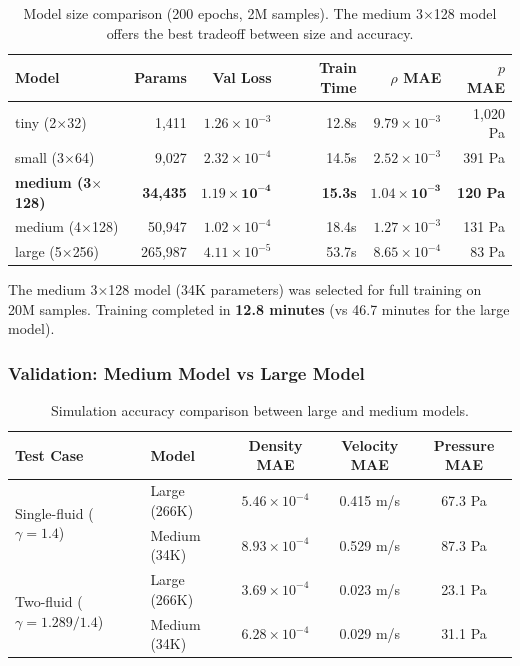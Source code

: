 \documentclass[11pt,a4paper]{article}
\begin{document}
\begin{table}[H]
\centering
\begin{tabular}{lrrrrr}
\toprule
Model & Params & Val Loss & Train Time & $\rho$ MAE & $p$ MAE \\
\midrule
tiny (2$\times$32) & 1,411 & $1.26 \times 10^{-3}$ & 12.8s & $9.79 \times 10^{-3}$ & 1,020 Pa \\
small (3$\times$64) & 9,027 & $2.32 \times 10^{-4}$ & 14.5s & $2.52 \times 10^{-3}$ & 391 Pa \\
\textbf{medium (3$\times$128)} & \textbf{34,435} & $\mathbf{1.19 \times 10^{-4}}$ & \textbf{15.3s} & $\mathbf{1.04 \times 10^{-3}}$ & \textbf{120 Pa} \\
medium (4$\times$128) & 50,947 & $1.02 \times 10^{-4}$ & 18.4s & $1.27 \times 10^{-3}$ & 131 Pa \\
large (5$\times$256) & 265,987 & $4.11 \times 10^{-5}$ & 53.7s & $8.65 \times 10^{-4}$ & 83 Pa \\
\bottomrule
\end{tabular}
\caption{Model size comparison (200 epochs, 2M samples). The medium 3$\times$128 model offers the best tradeoff between size and accuracy.}
\label{tab:model_sizes}
\end{table}

The medium 3$\times$128 model (34K parameters) was selected for full training on 20M samples. Training completed in \textbf{12.8 minutes} (vs 46.7 minutes for the large model).

\subsubsection{Validation: Medium Model vs Large Model}

\begin{table}[H]
\centering
\begin{tabular}{llccc}
\toprule
Test Case & Model & Density MAE & Velocity MAE & Pressure MAE \\
\midrule
\multirow{2}{*}{Single-fluid ($\gamma=1.4$)}
    & Large (266K) & $5.46 \times 10^{-4}$ & 0.415 m/s & 67.3 Pa \\
    & Medium (34K) & $8.93 \times 10^{-4}$ & 0.529 m/s & 87.3 Pa \\
\midrule
\multirow{2}{*}{Two-fluid ($\gamma=1.289/1.4$)}
    & Large (266K) & $3.69 \times 10^{-4}$ & 0.023 m/s & 23.1 Pa \\
    & Medium (34K) & $6.28 \times 10^{-4}$ & 0.029 m/s & 31.1 Pa \\
\bottomrule
\end{tabular}
\caption{Simulation accuracy comparison between large and medium models.}
\label{tab:model_comparison}
\end{table}
\end{document}
